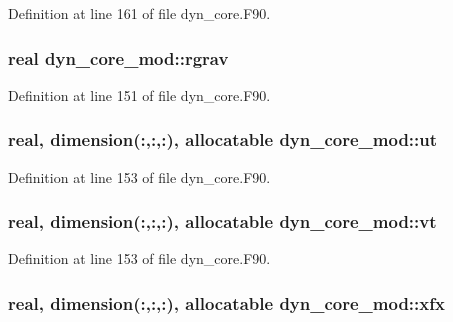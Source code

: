Definition at line 161 of file dyn\-\_\-core.\-F90.

\subsubsection[{rgrav}]{\setlength{\rightskip}{0pt plus 5cm}real dyn\-\_\-core\-\_\-mod\-::rgrav\hspace{0.3cm}{\ttfamily [private]}}\label{classdyn__core__mod_ae3293d99dac97da219d947fa14fe4b81}


Definition at line 151 of file dyn\-\_\-core.\-F90.

\subsubsection[{ut}]{\setlength{\rightskip}{0pt plus 5cm}real, dimension(\-:,\-:,\-:), allocatable dyn\-\_\-core\-\_\-mod\-::ut\hspace{0.3cm}{\ttfamily [private]}}\label{classdyn__core__mod_a759f692eeae8f494dd172747b34ef905}


Definition at line 153 of file dyn\-\_\-core.\-F90.

\subsubsection[{vt}]{\setlength{\rightskip}{0pt plus 5cm}real, dimension(\-:,\-:,\-:), allocatable dyn\-\_\-core\-\_\-mod\-::vt\hspace{0.3cm}{\ttfamily [private]}}\label{classdyn__core__mod_ae72eb5ce40fd8affec5a6642475e80ba}


Definition at line 153 of file dyn\-\_\-core.\-F90.

\subsubsection[{xfx}]{\setlength{\rightskip}{0pt plus 5cm}real, dimension(\-:,\-:,\-:), allocatable dyn\-\_\-core\-\_\-mod\-::xfx\hspace{0.3cm}{\ttfamily [private]}}\label{classdyn__core__mod_a0318e308d1a1f5accf19d8b901feebe5}


